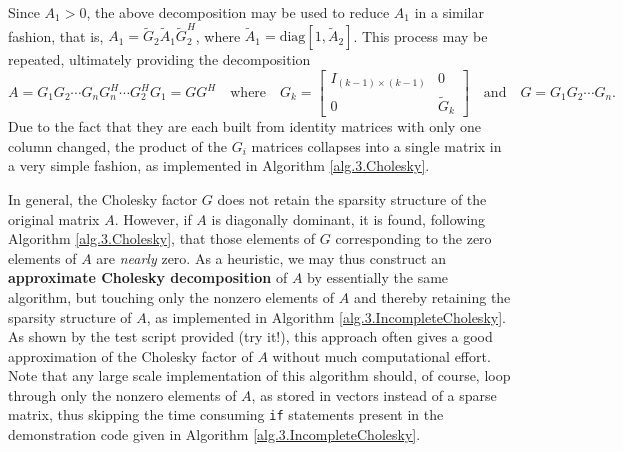 Since $A_1>0$, the above decomposition may be used to reduce $A_1$ in a similar fashion, that is, $A_1=\tilde G_2\tilde A_1 \tilde G_2^H$,
where $\tilde A_1=\textrm{diag}[1,\tilde A_2]$.  This process may
be repeated, ultimately providing the decomposition
\begin{equation*}
  A=G_1 G_2 \cdots G_{n} G_{n}^H \cdots G_2^H G_1 = G G^H \quad \textrm{where} \quad G_k = \begin{bmatrix} I_{(k-1)\times (k-1)} & 0 \\ 0 & \tilde G_k \end{bmatrix}  \quad \textrm{and} \quad
G=G_1 G_2 \cdots G_{n}.
\end{equation*}
Due to the fact that they are each built from identity matrices with only one column changed, the product of the $G_i$ matrices collapses into a single matrix in a very simple fashion,
as implemented in Algorithm \ref{alg.3.Cholesky}.

\begin{figure*}[t]

\end{figure*}


\noindent In general, the Cholesky factor $G$ does not retain the sparsity structure of the original matrix $A$.  However, if $A$ is diagonally dominant, it is found, following Algorithm \ref{alg.3.Cholesky},
that those elements of $G$ corresponding to the zero elements of $A$ are {\it nearly} zero.  As a heuristic, we may thus construct
an {\bf approximate Cholesky decomposition} of $A$ by essentially the same algorithm, but touching only the nonzero elements of $A$ and thereby retaining the sparsity structure of $A$,
as implemented in Algorithm \ref{alg.3.IncompleteCholesky}.  As shown by the test script provided (try it!), this approach often gives a good approximation of the Cholesky factor of $A$
without much computational effort.  Note that any large scale implementation of this algorithm should, of course,
loop through only the nonzero elements of $A$, as stored in vectors instead of a sparse matrix, thus skipping the time consuming {\tt if} statements
present in the demonstration code given in Algorithm \ref{alg.3.IncompleteCholesky}.

